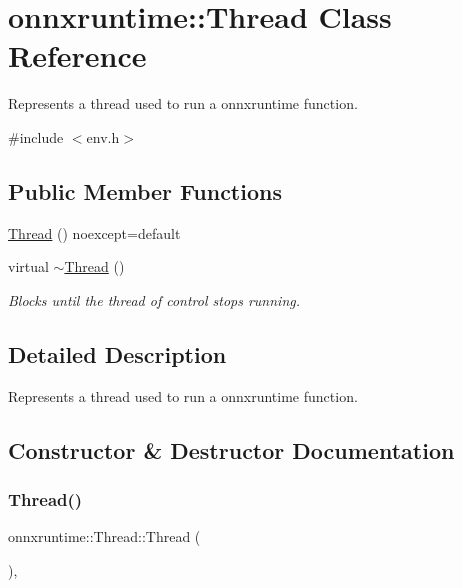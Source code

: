 \hypertarget{classonnxruntime_1_1Thread}{}\section{onnxruntime\+:\+:Thread Class Reference}
\label{classonnxruntime_1_1Thread}


Represents a thread used to run a onnxruntime function.  




{\ttfamily \#include $<$env.\+h$>$}

\subsection*{Public Member Functions}
\begin{DoxyCompactItemize}
\item 
\mbox{\hyperlink{classonnxruntime_1_1Thread_a8aef1a0f81790ceb10475152ea1008dd}{Thread}} () noexcept=default
\item 
virtual \mbox{\hyperlink{classonnxruntime_1_1Thread_a9a39fa069f5482dec645baca35b2caa3}{$\sim$\+Thread}} ()
\begin{DoxyCompactList}\small\item\em Blocks until the thread of control stops running. \end{DoxyCompactList}\end{DoxyCompactItemize}


\subsection{Detailed Description}
Represents a thread used to run a onnxruntime function. 

\subsection{Constructor \& Destructor Documentation}
\mbox{\label{classonnxruntime_1_1Thread_a8aef1a0f81790ceb10475152ea1008dd}} 
\subsubsection{\texorpdfstring{Thread()}{Thread()}}
{\footnotesize\ttfamily onnxruntime\+::\+Thread\+::\+Thread (\begin{DoxyParamCaption}{ }\end{DoxyParamCaption})\hspace{0.3cm}{\ttfamily [default]}, {\ttfamily [noexcept]}}

